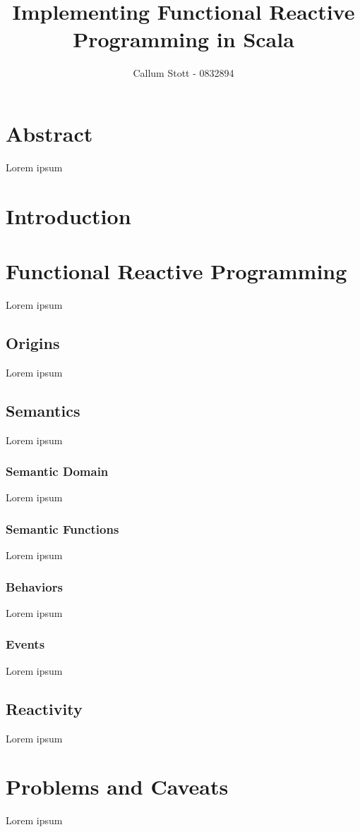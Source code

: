 \documentclass{article}
\title{Implementing Functional Reactive Programming in Scala}
\author{Callum Stott - 0832894}
\begin{document}
  \maketitle
  
  \newpage
  \tableofcontents
  
  \newpage
  
  \section*{Abstract}
  Lorem ipsum
  \section{Introduction}
  \section{Functional Reactive Programming}
  Lorem ipsum
    \subsection{Origins}
    Lorem ipsum
    \subsection{Semantics}
    Lorem ipsum
      \subsubsection{Semantic Domain}
      Lorem ipsum
      \subsubsection{Semantic Functions}
      Lorem ipsum
      \subsubsection{Behaviors}
      Lorem ipsum
      \subsubsection{Events}
      Lorem ipsum
    \subsection{Reactivity}
    Lorem ipsum
  \section{Problems and Caveats}
    Lorem ipsum
\end{document}
